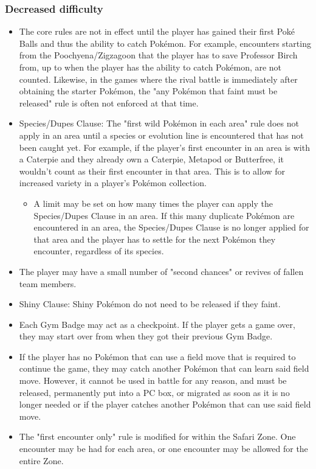 \documentclass{article}
\begin{document}
	\subsubsection{Decreased difficulty}
			\begin{itemize}
				\item 
					The core rules are not in effect until the player has gained their first Poké Balls and thus the ability to catch Pokémon. For example, encounters starting from the Poochyena/Zigzagoon that the player has to save Professor Birch from, up to when the player has the ability to catch Pokémon, are not counted. Likewise, in the games where the rival battle is immediately after obtaining the starter Pokémon, the "any Pokémon that faint must be released" rule is often not enforced at that time.
				\item
					Species/Dupes Clause: The "first wild Pokémon in each area" rule does not apply in an area until a species or evolution line is encountered that has not been caught yet. For example, if the player's first encounter in an area is with a Caterpie and they already own a Caterpie, Metapod or Butterfree, it wouldn't count as their first encounter in that area. This is to allow for increased variety in a player's Pokémon collection.
				\begin{itemize}
					\item[] A limit may be set on how many times the player can apply the Species/Dupes Clause in an area. If this many duplicate Pokémon are encountered in an area, the Species/Dupes Clause is no longer applied for that area and the player has to settle for the next Pokémon they encounter, regardless of its species.
				\end{itemize}
				\item
					The player may have a small number of "second chances" or revives of fallen team members.
				\item
					Shiny Clause: Shiny Pokémon do not need to be released if they faint.
				\item
					Each Gym Badge may act as a checkpoint. If the player gets a game over, they may start over from when they got their previous Gym Badge.
				\item
					If the player has no Pokémon that can use a field move that is required to continue the game, they may catch another Pokémon that can learn said field move. However, it cannot be used in battle for any reason, and must be released, permanently put into a PC box, or migrated as soon as it is no longer needed or if the player catches another Pokémon that can use said field move.
				\item
					The "first encounter only" rule 
is modified for within the Safari Zone. One encounter may be had for each area, or one encounter may be allowed for the entire Zone.
			\end{itemize}
\end{document}

